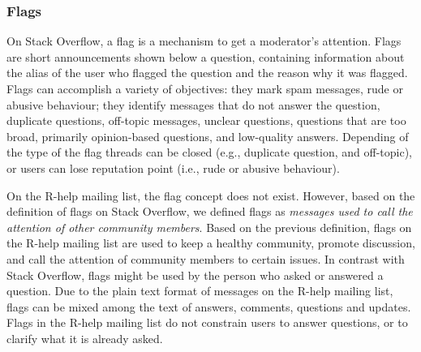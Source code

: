 \documentclass{sig-alternate-05-2015}
\begin{document}

\subsubsection{Flags}

	On Stack Overflow, a flag is a mechanism to get a moderator's attention.
	Flags are short announcements shown below a question, containing information about the alias of the user who flagged the question and the reason why it was flagged.
	Flags can accomplish a variety of objectives: they mark spam messages, rude or abusive behaviour; they identify messages that do not answer the question, duplicate questions, off-topic messages, unclear questions, questions that are too broad, primarily opinion-based questions, and low-quality answers.
	Depending of the type of the flag threads can be closed (e.g., duplicate question, and off-topic), or users can lose reputation point (i.e., rude or abusive behaviour).


	On the R-help mailing list, the flag concept does not exist. 
	However, based on the definition of flags on Stack Overflow, we defined flags as \emph{messages used to call the attention of other community members}.
	Based on the previous definition, flags on the R-help mailing list are used to keep a healthy community, promote discussion, and call the attention of community members to certain issues.
	In contrast with Stack Overflow, flags might be used by the person who asked or answered a question.
	Due to the plain text format of messages on the R-help mailing list, flags can be mixed among the text of answers, comments, questions and updates.
	Flags in the R-help mailing list do not constrain users to answer questions, or to clarify what it is already asked.
\end{document}
